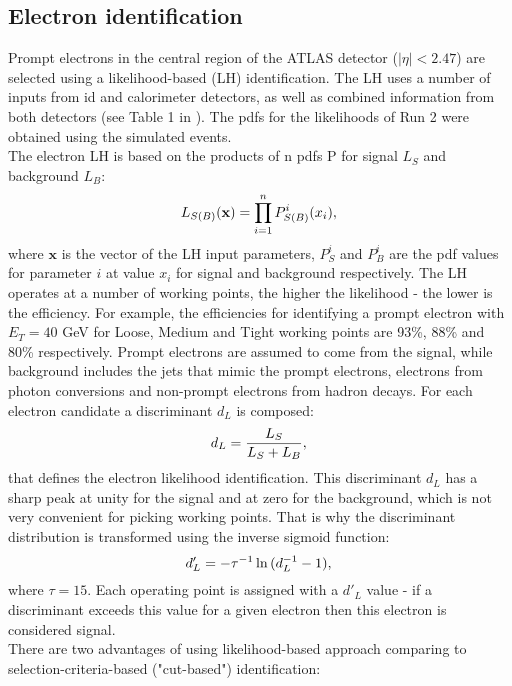     \subsection{Electron identification}
    Prompt electrons in the central region of the ATLAS detector ($|\eta|<2.47$) are selected using a likelihood-based (LH) identification. The LH uses a number of inputs from \gls{id} and calorimeter detectors, as well as combined information from both detectors (see Table 1 in \cite{electrons_reco1}). The \gls{pdfs} for the likelihoods of Run 2 were obtained using the simulated events.\\
    The electron LH is based on the products of n \gls{pdfs} P for signal $L_S$ and background $L_B$:
    \begin{equation}
    L_{S(B)}(\textbf{x}) = \prod_{i=1}^n P^i_{S(B)}(x_i),\\
    \end{equation}
    where $\textbf{x}$ is the vector of the LH input parameters, $P^i_{S}$ and $P^i_{B}$ are the pdf values for parameter $i$ at value $x_i$ for signal and background respectively.
    The LH operates at a number of working points, the higher the likelihood - the lower is the efficiency. For example, the efficiencies for identifying a prompt electron with $E_T=40$ GeV for Loose, Medium and Tight working points are 93\%, 88\% and 80\% respectively. Prompt electrons are assumed to come from the signal, while background includes the jets that mimic the prompt electrons, electrons from photon conversions and non-prompt electrons from hadron decays. For each electron candidate a discriminant $d_L$ is composed:
     \begin{equation}
    d_L=\frac{L_S}{L_S+L_B},\\
    \end{equation}
    that defines the electron likelihood identification. This discriminant $d_L$ has a sharp peak at unity for the signal and at zero for the background, which is not very convenient for picking working points. That is why the discriminant distribution is transformed using the inverse sigmoid function:
     \begin{equation}
    d_L^{\prime}=-\tau^{-1}\ln{(d^{-1}_L-1)},\\
    \end{equation}
    where $\tau=15$. Each operating point is assigned with a $d'_L$ value - if a discriminant exceeds this value for a given electron then this electron is considered signal.\\
    There are two advantages of using likelihood-based approach comparing to selection-criteria-based ("cut-based") identification:
